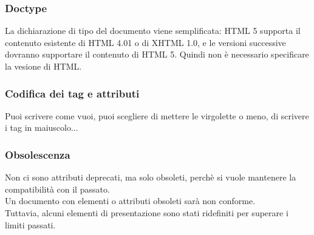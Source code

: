 \documentclass{article}
\begin{document}
\subsubsection{Doctype}
La dichiarazione di tipo del documento viene semplificata: HTML 5 supporta il contenuto esistente di HTML 4.01 o di XHTML 1.0, e le versioni successive dovranno supportare il contenuto di HTML 5. Quindi non è necessario specificare la vesione di HTML.
\subsubsection{Codifica dei tag e attributi}
Puoi scrivere come vuoi, puoi scegliere di mettere le virgolette o meno, di scrivere i tag in maiuscolo...
\subsubsection{Obsolescenza}
Non ci sono attributi deprecati, ma solo obsoleti, perchè si vuole mantenere la compatibilità con il passato.\\
Un documento con elementi o attributi obsoleti sarà non conforme.\\
Tuttavia, alcuni elementi di presentazione sono stati ridefiniti per superare i limiti passati.
\end{document}
